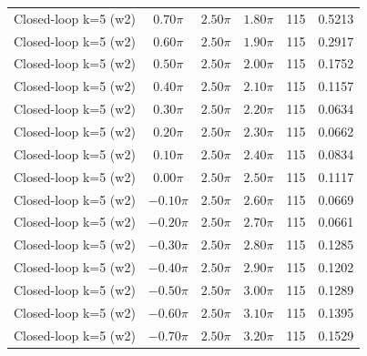 \begin{tabular}{lccccc}
Closed-loop k=5 (w2) & $0.70\pi$ & $2.50\pi$ & $1.80\pi$ & 115 & 0.5213 \\
Closed-loop k=5 (w2) & $0.60\pi$ & $2.50\pi$ & $1.90\pi$ & 115 & 0.2917 \\
Closed-loop k=5 (w2) & $0.50\pi$ & $2.50\pi$ & $2.00\pi$ & 115 & 0.1752 \\
Closed-loop k=5 (w2) & $0.40\pi$ & $2.50\pi$ & $2.10\pi$ & 115 & 0.1157 \\
Closed-loop k=5 (w2) & $0.30\pi$ & $2.50\pi$ & $2.20\pi$ & 115 & 0.0634 \\
Closed-loop k=5 (w2) & $0.20\pi$ & $2.50\pi$ & $2.30\pi$ & 115 & 0.0662 \\
Closed-loop k=5 (w2) & $0.10\pi$ & $2.50\pi$ & $2.40\pi$ & 115 & 0.0834 \\
Closed-loop k=5 (w2) & $0.00\pi$ & $2.50\pi$ & $2.50\pi$ & 115 & 0.1117 \\
Closed-loop k=5 (w2) & $-0.10\pi$ & $2.50\pi$ & $2.60\pi$ & 115 & 0.0669 \\
Closed-loop k=5 (w2) & $-0.20\pi$ & $2.50\pi$ & $2.70\pi$ & 115 & 0.0661 \\
Closed-loop k=5 (w2) & $-0.30\pi$ & $2.50\pi$ & $2.80\pi$ & 115 & 0.1285 \\
Closed-loop k=5 (w2) & $-0.40\pi$ & $2.50\pi$ & $2.90\pi$ & 115 & 0.1202 \\
Closed-loop k=5 (w2) & $-0.50\pi$ & $2.50\pi$ & $3.00\pi$ & 115 & 0.1289 \\
Closed-loop k=5 (w2) & $-0.60\pi$ & $2.50\pi$ & $3.10\pi$ & 115 & 0.1395 \\
Closed-loop k=5 (w2) & $-0.70\pi$ & $2.50\pi$ & $3.20\pi$ & 115 & 0.1529 \\
\bottomrule
\end{tabular}

